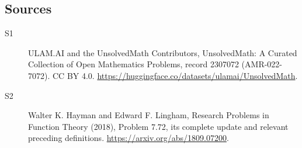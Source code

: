 \documentclass[11pt]{article}
\begin{document}
\subsection{Sources}
\begin{description}
\item[\hypertarget{source:2307072:1}{S1}] ULAM.AI and the UnsolvedMath Contributors, UnsolvedMath: A Curated Collection of Open Mathematics Problems, record 2307072 (AMR-022-7072). CC BY 4.0. \url{https://huggingface.co/datasets/ulamai/UnsolvedMath}.
\item[\hypertarget{source:2307072:2}{S2}] Walter K. Hayman and Edward F. Lingham, Research Problems in Function Theory (2018), Problem 7.72, its complete update and relevant preceding definitions. \url{https://arxiv.org/abs/1809.07200}.
\end{description}
\label{end:2307072}
\end{document}
